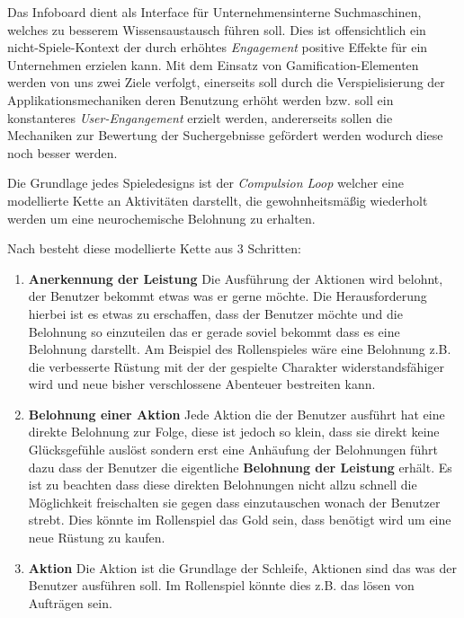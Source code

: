 \documentclass[12pt,twoside]{book}
\begin{document}
Das Infoboard dient als Interface für Unternehmensinterne Suchmaschinen, welches zu besserem Wissensaustausch führen soll. Dies ist offensichtlich ein nicht-Spiele-Kontext der durch erhöhtes \textit{Engagement} positive Effekte für ein Unternehmen erzielen kann.
Mit dem Einsatz von Gamification-Elementen werden von uns zwei Ziele verfolgt, einerseits soll durch die Verspielisierung der Applikationsmechaniken deren Benutzung erhöht werden bzw. soll ein konstanteres \textit{User-Engangement} erzielt werden, andererseits sollen die Mechaniken zur Bewertung der Suchergebnisse gefördert werden wodurch diese noch besser werden.


Die Grundlage jedes Spieledesigns ist der \textit{Compulsion Loop} welcher eine modellierte Kette an Aktivitäten darstellt, die gewohnheitsmäßig wiederholt werden um eine neurochemische Belohnung zu erhalten.

Nach \citep{gamasutra} besteht diese modellierte Kette aus 3 Schritten:

\begin{enumerate}
  \item \textbf{Anerkennung der Leistung} Die Ausführung der Aktionen wird belohnt, der Benutzer bekommt etwas was er gerne möchte. Die Herausforderung hierbei ist es etwas zu erschaffen, dass der Benutzer möchte und die Belohnung so einzuteilen das er gerade soviel bekommt dass es eine Belohnung darstellt. Am Beispiel des Rollenspieles wäre eine Belohnung z.B. die verbesserte Rüstung mit der der gespielte Charakter widerstandsfähiger wird und neue bisher verschlossene Abenteuer bestreiten kann.
  \item \textbf{Belohnung einer Aktion} Jede Aktion die der Benutzer ausführt hat eine direkte Belohnung zur Folge, diese ist jedoch so klein, dass sie direkt keine Glücksgefühle auslöst sondern erst eine Anhäufung der Belohnungen führt dazu dass der Benutzer die eigentliche \textbf{Belohnung der Leistung} erhält. Es ist zu beachten dass diese direkten Belohnungen nicht allzu schnell die Möglichkeit freischalten sie gegen dass einzutauschen wonach der Benutzer strebt. Dies könnte im Rollenspiel das Gold sein, dass benötigt wird um eine neue Rüstung zu kaufen.
  \item \textbf{Aktion} Die Aktion ist die Grundlage der Schleife, Aktionen sind das was der Benutzer ausführen soll. Im Rollenspiel könnte dies z.B. das lösen von Aufträgen sein.
\end{enumerate}
\end{document}
